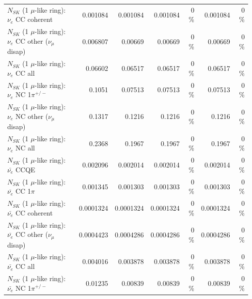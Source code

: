 \begin{table}
\begin{tabular}{| l | r | r | r  r | r  r |}
                               $N_{SK}$ (1 $\mu$-like ring): $\nu_e$ CC coherent &        0.001084 &        0.001084 &        0.001084 &        0 \%  &        0.001084 &        0 \%  \\ 
                $N_{SK}$ (1 $\mu$-like ring): $\nu_e$ CC other ($\nu_\mu$ disap) &        0.006807 &         0.00669 &         0.00669 &        0 \%  &         0.00669 &        0 \%  \\ 
                                  $N_{SK}$ (1 $\mu$-like ring): $\nu_{e}$ CC all &         0.06602 &         0.06517 &         0.06517 &        0 \%  &         0.06517 &        0 \%  \\ 
\hline
                           $N_{SK}$ (1 $\mu$-like ring): $\nu_e$ NC 1$\pi^{+/-}$ &          0.1051 &         0.07513 &         0.07513 &        0 \%  &         0.07513 &        0 \%  \\ 
                $N_{SK}$ (1 $\mu$-like ring): $\nu_e$ NC other ($\nu_\mu$ disap) &          0.1317 &          0.1216 &          0.1216 &        0 \%  &          0.1216 &        0 \%  \\ 
                                  $N_{SK}$ (1 $\mu$-like ring): $\nu_{e}$ NC all &          0.2368 &          0.1967 &          0.1967 &        0 \%  &          0.1967 &        0 \%  \\ 
\hline
\hline
\hline
                                $N_{SK}$ (1 $\mu$-like ring): $\bar{\nu_e}$ CCQE &        0.002096 &        0.002014 &        0.002014 &        0 \%  &        0.002014 &        0 \%  \\ 
                           $N_{SK}$ (1 $\mu$-like ring): $\bar{\nu_e}$ CC 1$\pi$ &        0.001345 &        0.001303 &        0.001303 &        0 \%  &        0.001303 &        0 \%  \\ 
                         $N_{SK}$ (1 $\mu$-like ring): $\bar{\nu_e}$ CC coherent &       0.0001324 &       0.0001324 &       0.0001324 &        0 \%  &       0.0001324 &        0 \%  \\ 
          $N_{SK}$ (1 $\mu$-like ring): $\bar{\nu_e}$ CC other ($\nu_\mu$ disap) &       0.0004423 &       0.0004286 &       0.0004286 &        0 \%  &       0.0004286 &        0 \%  \\ 
                            $N_{SK}$ (1 $\mu$-like ring): $\bar{\nu_{e}}$ CC all &        0.004016 &        0.003878 &        0.003878 &        0 \%  &        0.003878 &        0 \%  \\ 
\hline
                     $N_{SK}$ (1 $\mu$-like ring): $\bar{\nu_e}$ NC 1$\pi^{+/-}$ &         0.01235 &         0.00839 &         0.00839 &        0 \%  &         0.00839 &        0 \%  \\ 

\end{tabular}
\end{table}

